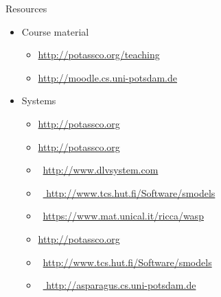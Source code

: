 \begin{frame}{Resources}
  \begin{itemize}
  \item Course material
    \begin{itemize}
    \item \url{http://potassco.org/teaching}
\ifLECTURE
    \item \url{http://moodle.cs.uni-potsdam.de}
\fi
    \end{itemize}
  \item Systems
    \begin{itemize}
    \item \alert{\clasp} \hfill \url{http://potassco.org}
    \item \alert{\clingo}\hfill \url{http://potassco.org}
    \item \dlv\ \hfill \url{http://www.dlvsystem.com}
    \item \smodels\ \hfill \url{ http://www.tcs.hut.fi/Software/smodels}%
    \item \wasp\ \hfill \url{https://www.mat.unical.it/ricca/wasp}
      \medskip
    \item \alert{\gringo} \hfill \url{http://potassco.org}
    \item \lparse\ \hfill \url{http://www.tcs.hut.fi/Software/smodels}%
      \bigskip
    \item \asparagus\ \hfill \url{ http://asparagus.cs.uni-potsdam.de}
    \end{itemize}
  \end{itemize}
\end{frame}
